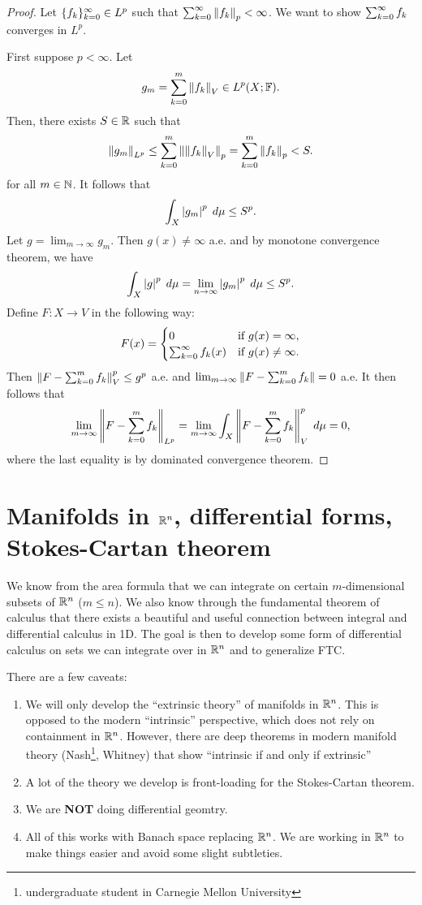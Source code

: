 \documentclass[a4paper]{article}
\begin{document}
\begin{proof}
Let $\{ f_k \}_{k=0}^\infty \in L^p$ such that $\sum_{k=0}^\infty \left\lVert f_k\right\rVert_p
< \infty$. We want to show $\sum_{k=0}^\infty f_k$ converges in $L^p$.

First suppose $p < \infty$. Let
\[
g_m = \sum_{k=0}^m \left\lVert f_k\right\rVert_V \in L^p(X; \mathbb{F}).
\]
Then, there exists $S \in \mathbb{R}$ such that
\[
\left\lVert g_m\right\rVert_{L^p} \leq \sum_{k=0}^m \left\lVert \left\lVert f_k\right\rVert_V\right\rVert_p
= \sum_{k=0}^m \left\lVert f_k\right\rVert_p < S.
\]
for all $m \in \mathbb{N}$. It follows that
\[
\int_X \left\lvert g_m\right\rvert^p \; d \mu \leq S^p.
\]
Let $g = \lim_{m \to \infty} g_m$. Then
$g(x) \neq \infty$ a.e. and by monotone convergence theorem,
we have
\[
\int_X \left\lvert g\right\rvert^p \; d \mu = \lim_{n \to \infty}
\left\lvert g_m\right\rvert^p \; d \mu \leq S^p.
\]
Define $F: X \to V$ in the following way:
\[
F(x) = \begin{cases}
  0 & \text{if $g(x) = \infty$}, \\
  \sum_{k=0}^\infty f_k(x) & \text{if $g(x) \neq \infty$}.
\end{cases}
\]
Then $\left\lVert F - \sum_{k=0}^m f_k\right\rVert_V^p \leq g^p$ a.e.
and $\lim_{m \to \infty} \left\lVert F - \sum_{k=0}^m f_k\right\rVert = 0$ a.e.
It then follows that
\[
\lim_{m \to \infty} \left\lVert F - \sum_{k=0}^m f_k\right\rVert_{L^p}
= \lim_{m \to \infty} \int_X \left\lVert F - \sum_{k=0}^m f_k\right\rVert^p_V \; d \mu
= 0,
\]
where the last equality is by dominated convergence
theorem.
\end{proof}





\section{Manifolds in $\mathbb{R}^n$, differential forms,
Stokes-Cartan theorem}

We know from the area formula that we can integrate on
certain $m$-dimensional subsets of $\mathbb{R}^n$ ($m \leq n$).
We also know through the fundamental theorem of calculus that
there exists a beautiful and useful connection between
integral and differential calculus in 1D. The goal is then
to develop some form of differential calculus on sets we can
integrate over in $\mathbb{R}^n$ and to generalize FTC.

There are a few caveats:
\begin{enumerate}
\item We will only develop the ``extrinsic theory'' of
manifolds in $\mathbb{R}^n$. This is opposed to the modern ``intrinsic''
perspective, which does not rely on containment in $\mathbb{R}^n$.
However, there are deep theorems in modern manifold theory
(Nash\footnote{undergraduate student in Carnegie Mellon
University}, Whitney) that show ``intrinsic if and only if
extrinsic''

\item A lot of the theory we develop is front-loading
for the Stokes-Cartan theorem.

\item We are \textbf{NOT} doing differential geomtry.

\item All of this works with Banach space replacing $\mathbb{R}^n$.
We are working in $\mathbb{R}^n$ to make things easier and avoid
some slight subtleties.
\end{enumerate}
\end{document}
